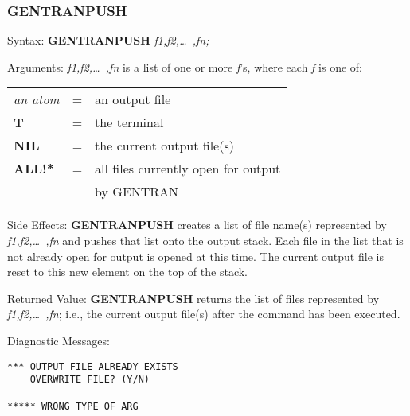\subsubsection{GENTRANPUSH}
\begin{describe}{Syntax:}
{\bf GENTRANPUSH} {\it f1,f2,\dots\ ,fn;}
\end{describe}
\begin{describe}{Arguments:}
{\it f1,f2,\dots\ ,fn\/} is a list of one or more {\it f\/}'s, where each
{\it f\/} is one of:
\begin{center}
\begin{tabular}{lll}
{\it an atom} & = & an output file\\
{\bf T} & = & the terminal\\
{\bf NIL} & = & the current output file(s)\\
{\bf ALL!*} & = & all files currently open for output \\
& & by GENTRAN\\
\end{tabular}
\end{center}
\end{describe}
\begin{describe}{Side Effects:}
{\bf GENTRANPUSH} creates a list of file name(s) represented by
{\it f1,f2,\dots\ ,fn\/} and pushes that list onto the output stack.  Each file
in the list that is not already open for output is opened at this time.  The
current output file is reset to this new element on the top of the stack.
\end{describe}
\begin{describe}{Returned Value:}
{\bf GENTRANPUSH} returns the list of files represented by 
{\it f1,f2,\dots\ ,fn\/};
i.e., the current output file(s) after the command has been executed.
\end{describe}
\begin{describe}{Diagnostic Messages:}
\begin{verbatim}
*** OUTPUT FILE ALREADY EXISTS
    OVERWRITE FILE? (Y/N)

***** WRONG TYPE OF ARG
\end{verbatim}
\end{describe}

